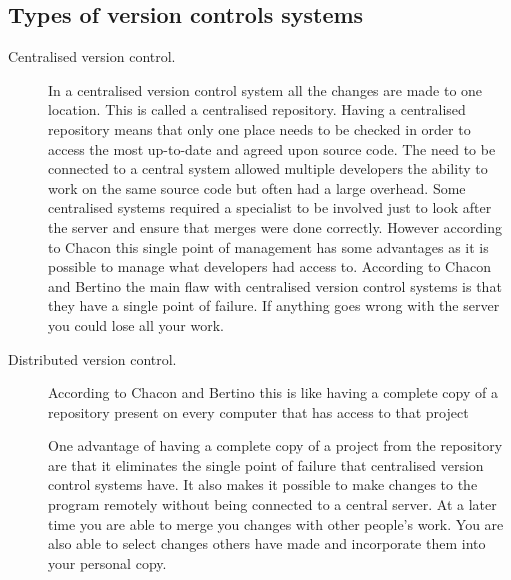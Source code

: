 
\subsection{Types of version controls systems}
\begin{description}

  \item [Centralised version control.] 
  In a centralised version control system all the changes are made to one location.
  This is called a centralised repository.
  Having a centralised repository means that only one place needs to be checked in order to access the most up-to-date and agreed upon source code.
  The need to be connected to a central system allowed multiple developers the ability to work on the same source code but often had a large overhead.
  Some centralised systems required a specialist to be involved just to look after the server and ensure that merges were done correctly.
  However according to Chacon \cite{Chacon2009} this single point of management has some advantages as it is possible to manage what developers had access to. 
  According to Chacon \cite{Chacon2009} and Bertino \cite{Bertino2012} the main flaw with centralised version control systems is that they have a single point of failure.
  If anything goes wrong with the server you could lose all your work.

  \item [Distributed version control.] 
  According to Chacon \cite{Chacon2009} and Bertino \cite{Bertino2012} this is like having a complete copy of a repository present on every computer that has access to that project

  One advantage of having a complete copy of a project from the repository are that it eliminates the single point of failure that centralised version control systems have.
  It also makes it possible to make changes to the program remotely without being connected to a central server.
  At a later time you are able to merge you changes with other people's work.  
  You are also able to select changes others have made and incorporate them into your personal copy.


\end{description}
